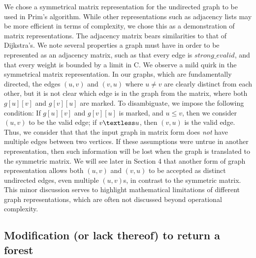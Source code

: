 We chose a symmetrical matrix representation for the undirected graph to be used in Prim's algorithm. While other representations such as adjacency lists may be more efficient in terms of complexity, we chose this as a demonstration of matrix representations.
\newline\newline
The adjacency matrix bears similarities to that of Dijkstra's. We note several properties a graph must have in order to be represented as an adjacency matrix, such as that every edge is $strong\_evalid$, and that every weight is bounded by a limit in C.
\newline\newline
We observe a mild quirk in the symmetrical matrix representation. In our graphs, which are fundamentally directed, the edges $(u,v)$ and $(v,u)$ where $u \neq v$ are clearly distinct from each other, but it is not clear which edge is in the graph from the matrix, where both $g[u][v]$ and $g[v][u]$ are marked. To disambiguate, we impose the following condition: If $g[u][v]$ and $g[v][u]$ is marked, and $u \leq v$, then we consider $(u,v)$ to be the valid edge; if $v \textless u$, then $(v,u)$ is the valid edge.
\newline\newline
Thus, we consider that that the input graph in matrix form does \textit{not} have multiple edges between two vertices. If these assumptions were untrue in another representation, then such information will be lost when the graph is translated to the symmetric matrix. We will see later in Section 4 that another form of graph representation allows both $(u,v)$ and $(v,u)$ to be accepted as distinct undirected edges, even multiple $(u,v)$s, in contrast to the symmetric matrix.
\newline\newline
This minor discussion serves to highlight mathematical limitations of different graph representations, which are often not discussed beyond operational complexity.

\subsection{Modification (or lack thereof) to return a forest}


